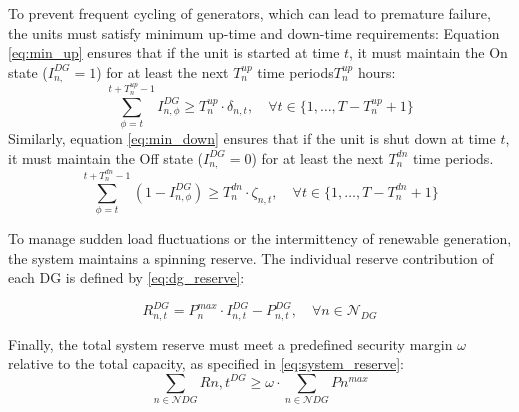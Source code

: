 \documentclass[preprint,12pt]{elsarticle}
\begin{document}
To prevent frequent cycling of generators, which can lead to premature failure, the units must satisfy minimum up-time and down-time requirements:
Equation \eqref{eq:min_up} ensures that if the unit is started at time $t$, it must maintain the On state ($I_{n,}^{DG}=1$) for at least the next $T_n^{up}$ time periods$T_n^{up}$ hours:
\begin{equation}
\sum_{\phi=t}^{t+T_n^{up}-1} I_{n,\phi}^{DG} \ge T_n^{up} \cdot \delta_{n,t}, \quad \forall t \in \{1, \dots, T - T_n^{up} + 1\}
\label{eq:min_up}
\end{equation}
Similarly, equation \eqref{eq:min_down} ensures that if the unit is shut down at time $t$, it must maintain the Off state ($I_{n,}^{DG}=0$) for at least the next $T_n^{dn}$ time periods.
\begin{equation}
\sum_{\phi=t}^{t+T_n^{dn}-1} (1 - I_{n,\phi}^{DG}) \ge T_n^{dn} \cdot \zeta_{n,t}, \quad \forall t \in \{1, \dots, T - T_n^{dn} + 1\}
\label{eq:min_down}
\end{equation}

To manage sudden load fluctuations or the intermittency of renewable generation, the system maintains a spinning reserve. The individual reserve contribution of each DG is defined by \eqref{eq:dg_reserve}:

\begin{equation}
R_{n,t}^{DG} = P_{n}^{max} \cdot I_{n,t}^{DG} - P_{n,t}^{DG}, \quad \forall n \in \mathcal{N}_{DG}
\label{eq:dg_reserve}
\end{equation}

Finally, the total system reserve must meet a predefined security margin $\omega$ relative to the total capacity, as specified in \eqref{eq:system_reserve}:
\begin{equation}
\sum_{n \in \mathcal{N}{DG}} R{n,t}^{DG} \ge \omega \cdot \sum_{n \in \mathcal{N}{DG}} P{n}^{max}
\label{eq:system_reserve}
\end{equation}
\end{document}
